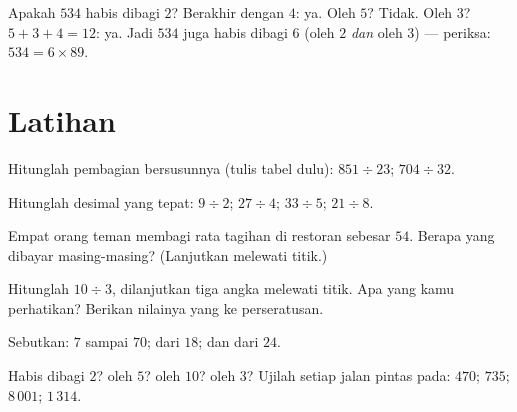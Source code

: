 \begin{example}\label{ex:g5:division:criteria}
Apakah $534$ habis dibagi $2$? Berakhir dengan $4$: ya. Oleh $5$?
Tidak. Oleh $3$? $5 + 3 + 4 = 12$: ya. Jadi $534$ juga habis dibagi
$6$ (oleh $2$ \emph{dan} oleh $3$) --- periksa: $534 = 6 \times 89$.
\end{example}

\section{Latihan}

\begin{exercise}[$\star$]\label{exo:g5:division:1}
Hitunglah pembagian bersusunnya (tulis tabel  dulu):
$851 \div 23$; \quad $704 \div 32$.
\end{exercise}

\begin{exercise}[$\star$]\label{exo:g5:division:2}
Hitunglah  desimal yang tepat: $9 \div 2$; \quad
$27 \div 4$; \quad $33 \div 5$; \quad $21 \div 8$.
\end{exercise}

\begin{exercise}[$\star$]\label{exo:g5:division:3}
Empat orang teman membagi rata tagihan di restoran sebesar $54$. Berapa
yang dibayar masing-masing? (Lanjutkan melewati titik.)
\end{exercise}

\begin{exercise}[$\star$]\label{exo:g5:division:4}
Hitunglah $10 \div 3$, dilanjutkan tiga angka melewati titik. Apa
yang kamu perhatikan? Berikan nilainya yang  ke perseratusan.
\end{exercise}

\begin{exercise}[$\star$]\label{exo:g5:division:5}
Sebutkan:  $7$ sampai $70$;  dari $18$; dan 
dari $24$.
\end{exercise}

\begin{exercise}[$\star$]\label{exo:g5:division:6}
Habis dibagi $2$? oleh $5$? oleh $10$? oleh $3$? Ujilah setiap jalan
pintas pada: $470$; \quad $735$; \quad $8\,001$; \quad $1\,314$.
\end{exercise}

